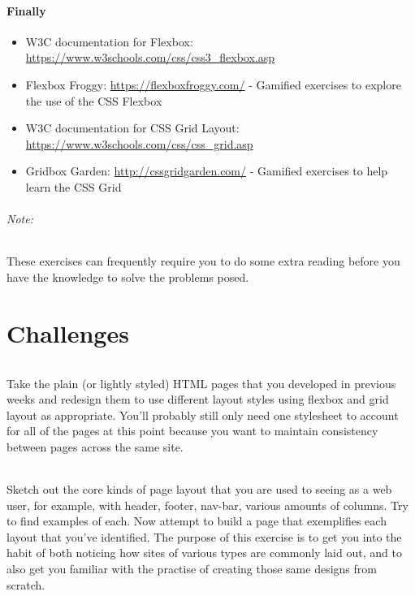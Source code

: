 \documentclass[10pt, a4paper, twosize]{article}
\begin{document}
\subsection*{Finally}
\begin{itemize}
\item W3C documentation for Flexbox: \url{https://www.w3schools.com/css/css3_flexbox.asp}
\item Flexbox Froggy: \url{https://flexboxfroggy.com/} - Gamified exercises to explore the use of the CSS Flexbox
\item W3C documentation for CSS Grid Layout: \url{https://www.w3schools.com/css/css_grid.asp}
\item Gridbox Garden: \url{http://cssgridgarden.com/} - Gamified exercises to help learn the CSS Grid
\end{itemize}

\paragraph{Note:} These exercises can frequently require you to do some extra reading before you have the knowledge to solve the problems posed.




\clearpage
\part{Challenges}
\paragraph{} Take the plain (or lightly styled) HTML pages that you developed in previous weeks and redesign them to use different layout styles using flexbox and grid layout as appropriate. You'll probably still only need one stylesheet to account for all of the pages at this point because you want to maintain consistency between pages across the same site.

\paragraph{} Sketch out the core kinds of page layout that you are used to seeing as a web user, for example, with header, footer, nav-bar, various amounts of columns. Try to find examples of each. Now attempt to build a page that exemplifies each layout that you've identified. The purpose of this exercise is to get you into the habit of both noticing how sites of various types are commonly laid out, and to also get you familiar with the practise of creating those same designs from scratch.
\end{document}
